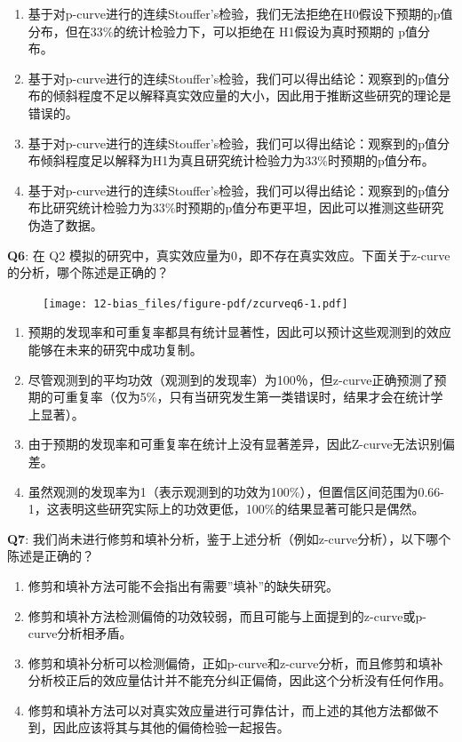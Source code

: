 \documentclass[
  letterpaper,
  DIV=11,
  numbers=noendperiod]{scrreprt}
\providecommand{\tightlist}{%
  \setlength{\itemsep}{0pt}\setlength{\parskip}{0pt}}\usepackage{longtable,booktabs,array}
\begin{document}
\begin{enumerate}
\def\labelenumi{\Alph{enumi})}
\tightlist
\item
  基于对p-curve进行的连续Stouffer's检验，我们无法拒绝在H0假设下预期的p值分布，但在33\%的统计检验力下，可以拒绝在
  H1假设为真时预期的 p值分布。
\item
  基于对p-curve进行的连续Stouffer's检验，我们可以得出结论：观察到的p值分布的倾斜程度不足以解释真实效应量的大小，因此用于推断这些研究的理论是错误的。
\item
  基于对p-curve进行的连续Stouffer's检验，我们可以得出结论：观察到的p值分布倾斜程度足以解释为H1为真且研究统计检验力为33\%时预期的p值分布。
\item
  基于对p-curve进行的连续Stouffer's检验，我们可以得出结论：观察到的p值分布比研究统计检验力为33\%时预期的p值分布更平坦，因此可以推测这些研究伪造了数据。
\end{enumerate}

\textbf{Q6}: 在 Q2
模拟的研究中，真实效应量为0，即不存在真实效应。下面关于z-curve的分析，哪个陈述是正确的？

\begin{figure}

{\centering \texttt{[image: 12-bias\_files/figure-pdf/zcurveq6-1.pdf]}

}

\end{figure}

\begin{enumerate}
\def\labelenumi{\Alph{enumi})}
\tightlist
\item
  预期的发现率和可重复率都具有统计显著性，因此可以预计这些观测到的效应能够在未来的研究中成功复制。
\item
  尽管观测到的平均功效（观测到的发现率）为100％，但z-curve正确预测了预期的可重复率（仅为5\%，只有当研究发生第一类错误时，结果才会在统计学上显著）。
\item
  由于预期的发现率和可重复率在统计上没有显著差异，因此Z-curve无法识别偏差。
\item
  虽然观测的发现率为1（表示观测到的功效为100\%），但置信区间范围为0.66-1，这表明这些研究实际上的功效更低，100\%的结果显著可能只是偶然。
\end{enumerate}

\textbf{Q7}:
我们尚未进行修剪和填补分析，鉴于上述分析（例如z-curve分析），以下哪个陈述是正确的？

\begin{enumerate}
\def\labelenumi{\Alph{enumi})}
\tightlist
\item
  修剪和填补方法可能不会指出有需要''填补''的缺失研究。
\item
  修剪和填补方法检测偏倚的功效较弱，而且可能与上面提到的z-curve或p-curve分析相矛盾。
\item
  修剪和填补分析可以检测偏倚，正如p-curve和z-curve分析，而且修剪和填补分析校正后的效应量估计并不能充分纠正偏倚，因此这个分析没有任何作用。
\item
  修剪和填补方法可以对真实效应量进行可靠估计，而上述的其他方法都做不到，因此应该将其与其他的偏倚检验一起报告。
\end{enumerate}
\end{document}
